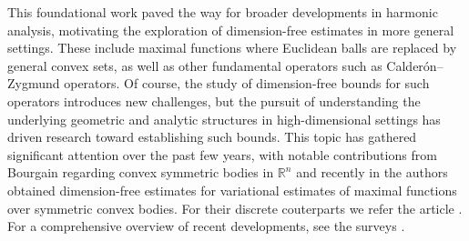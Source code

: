 \documentclass[11pt]{amsart}
\theoremstyle{definition}
\numberwithin{equation}{section}
\begin{document}
This foundational work paved the way for broader developments in harmonic analysis, motivating the exploration of dimension-free estimates in more general settings. These include maximal functions where Euclidean balls are replaced by general convex sets, as well as other fundamental operators such as Calder\'on--Zygmund operators. Of course, the study of dimension-free bounds for such operators introduces new challenges, but the pursuit of understanding the underlying geometric and analytic structures in high-dimensional settings has driven research toward establishing such bounds. This topic has gathered significant attention over the past few years, with notable contributions from Bourgain \cite{Bourgain87} regarding convex symmetric bodies in $\mathbb{R}^n$ and recently in \cite{Bourgain-GAFA} the authors obtained dimension-free estimates for variational estimates of maximal functions over symmetric convex bodies. For their discrete couterparts we refer the article \cite{Bourgain-AJM}. For a comprehensive overview of recent developments, see the surveys \cite{Bourgain-survey, DGM}. 
\end{document}
